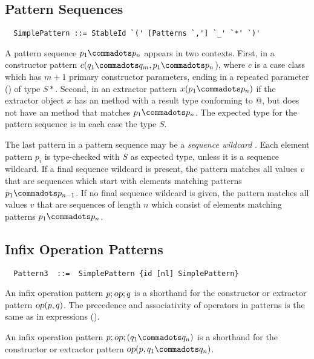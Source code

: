 \subsection{Pattern Sequences}\label{sec:pattern-seqs}

\syntax\begin{lstlisting}
  SimplePattern ::= StableId `(' [Patterns `,'] `_' `*' `)'
\end{lstlisting}

A pattern sequence $p_1 \commadots p_n$ appears in two
contexts. First, in a constructor pattern
$c(q_1 \commadots q_m, p_1 \commadots p_n$), where $c$ is a case
class which has $m+1$ primary constructor parameters, 
ending in a repeated parameter () of type 
$S*$. Second, in an extractor pattern
$x(p_1 \commadots p_n)$ if the extractor object $x$ has an
 method with a result type conforming to 
\lstinline@Seq[$S$]@, but does not have an  method that 
matches $p_1 \commadots p_n$.
The expected type for the pattern sequence is in each case the type $S$.

The last pattern in a pattern sequence may be a {\em sequence
wildcard} \code{_*}. Each element pattern $p_i$ is type-checked with
$S$ as expected type, unless it is a sequence wildcard. If a final
sequence wildcard is present, the pattern matches all values $v$ that
are sequences which start with elements matching patterns
$p_1 \commadots p_{n-1}$.  If no final sequence wildcard is given, the
pattern matches all values $v$ that are sequences of
length $n$ which consist of elements matching patterns $p_1 \commadots
p_n$.

\subsection{Infix Operation Patterns}

\syntax\begin{lstlisting}
  Pattern3  ::=  SimplePattern {id [nl] SimplePattern}
\end{lstlisting}

An infix operation pattern $p;\mbox{\sl op};q$ is a shorthand for the
constructor or extractor pattern $\mbox{\sl op}(p, q)$.  The precedence and
associativity of operators in patterns is the same as in expressions
().

An infix operation pattern $p;\op;(q_1 \commadots q_n)$ is a
shorthand for the constructor or extractor pattern $\op(p, q_1
\commadots q_n)$.

